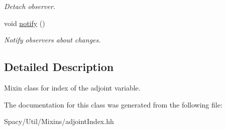 \begin{DoxyCompactItemize}
\begin{DoxyCompactList}\small\item\em Detach observer. \end{DoxyCompactList}\item 
\hypertarget{classSpacy_1_1Mixin_1_1MixinConnection_a1ddeaa78a3bb4a38c2cca36d1f99fe36}{}void \hyperlink{classSpacy_1_1Mixin_1_1MixinConnection_a1ddeaa78a3bb4a38c2cca36d1f99fe36}{notify} ()\label{classSpacy_1_1Mixin_1_1MixinConnection_a1ddeaa78a3bb4a38c2cca36d1f99fe36}

\begin{DoxyCompactList}\small\item\em Notify observers about changes. \end{DoxyCompactList}\end{DoxyCompactItemize}


\subsection{Detailed Description}
Mixin class for index of the adjoint variable. 

The documentation for this class was generated from the following file\+:\begin{DoxyCompactItemize}
\item 
Spacy/\+Util/\+Mixins/adjoint\+Index.\+hh\end{DoxyCompactItemize}
